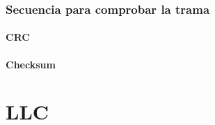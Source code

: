 \documentclass[12pt, fleqn]{report}                             %
\theoremstyle{break}                                            %
\begin{document}
            \subsection{Secuencia para comprobar la trama}
            \subsubsection{CRC}
            \subsubsection{Checksum}


            \chapter{LLC}

            

 


\end{document}

